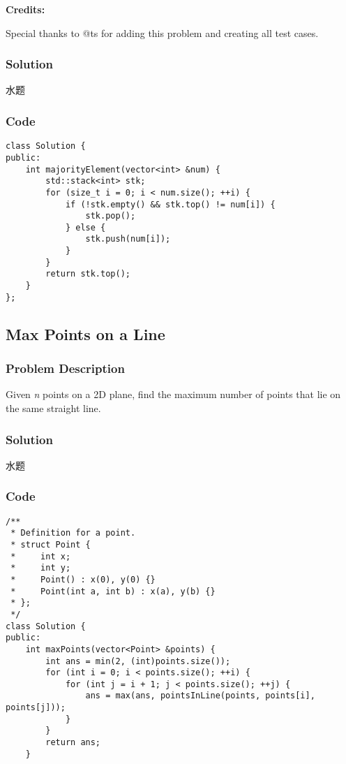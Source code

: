 \documentclass[courier]{article}
\begin{document}
\begin{CJK*}{UTF8}{gkai}
\textbf{Credits:}

Special thanks to @ts for adding this problem and creating all test cases.



\subsubsection*{Solution}
水题

\subsubsection*{Code}
\begin{lstlisting}
class Solution {
public:
    int majorityElement(vector<int> &num) {
        std::stack<int> stk;
        for (size_t i = 0; i < num.size(); ++i) {
            if (!stk.empty() && stk.top() != num[i]) {
                stk.pop();
            } else {
                stk.push(num[i]);
            }
        }
        return stk.top();
    }
}; 
\end{lstlisting}


\subsection{ Max Points on a Line }

\subsubsection*{Problem Description}
Given \emph{n} points on a 2D plane, find the maximum number of points that lie on the same straight line.



\subsubsection*{Solution}
水题

\subsubsection*{Code}
\begin{lstlisting}
/**
 * Definition for a point.
 * struct Point {
 *     int x;
 *     int y;
 *     Point() : x(0), y(0) {}
 *     Point(int a, int b) : x(a), y(b) {}
 * };
 */
class Solution {
public:
    int maxPoints(vector<Point> &points) {
        int ans = min(2, (int)points.size());
        for (int i = 0; i < points.size(); ++i) {
            for (int j = i + 1; j < points.size(); ++j) {
                ans = max(ans, pointsInLine(points, points[i], points[j]));
            }
        }
        return ans;
    }
    

\end{lstlisting}
\end{CJK*}
\end{document}
